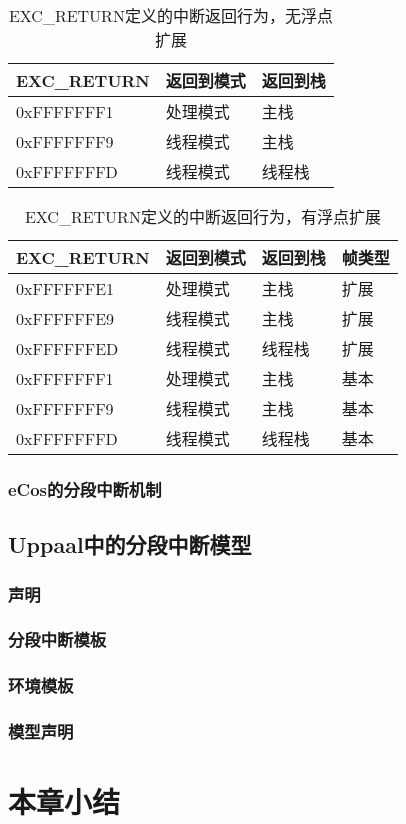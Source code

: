 \begin{table}[htb]
	\centering
	\caption{EXC\_RETURN定义的中断返回行为，无浮点扩展}
	\label{tab:exe_return_noFP}
	\begin{tabularx}{\linewidth}{XXX}
		\toprule[1.5pt]
		{\heiti EXC\_RETURN} & {\heiti 返回到模式} & {\heiti 返回到栈}\\
		\midrule[1pt]
		0xFFFFFFF1 & 处理模式 & 主栈 \\
		\midrule[0.5pt]
		0xFFFFFFF9 & 线程模式 & 主栈 \\
		\midrule[0.5pt]
		0xFFFFFFFD & 线程模式 & 线程栈 \\
		\bottomrule[1.5pt]
	\end{tabularx}
\end{table}

\begin{table}[htb]
	\centering
	\caption{EXC\_RETURN定义的中断返回行为，有浮点扩展}
	\label{tab:exe_return_FP}
	\begin{tabularx}{\linewidth}{XXXX}
		\toprule[1.5pt]
		{\heiti EXC\_RETURN} & {\heiti 返回到模式} & {\heiti 返回到栈} &
		{\heiti 帧类型}\\
		\midrule[1pt]
		0xFFFFFFE1 & 处理模式 & 主栈 & 扩展\\
		\midrule[0.5pt]
		0xFFFFFFE9 & 线程模式 & 主栈 & 扩展\\
		\midrule[0.5pt]
		0xFFFFFFED & 线程模式 & 线程栈 & 扩展\\
		\midrule[0.5pt]
		0xFFFFFFF1 & 处理模式 & 主栈 & 基本\\
		\midrule[0.5pt]
		0xFFFFFFF9 & 线程模式 & 主栈 & 基本\\
		\midrule[0.5pt]
		0xFFFFFFFD & 线程模式 & 线程栈 & 基本\\
		\bottomrule[1.5pt]
	\end{tabularx}
\end{table}

\subsubsection{eCos的分段中断机制} 
\label{subsubsec:ecos_intr}

\subsection{Uppaal中的分段中断模型}
\label{subsec:segment_uppaal}

\subsubsection{声明}
\label{subsubsec:segment_decl}

\subsubsection{分段中断模板}
\label{subsubsec:segment_intr}

\subsubsection{环境模板}
\label{subsubsec:segment_env}

\subsubsection{模型声明}
\label{subsubsec:segment_model_decl}

\section{本章小结}
\label{sec:sum_3}
